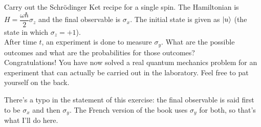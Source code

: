 \documentclass[solutions.tex]{subfiles}
\begin{document}
\maketitle
\begin{exercise} Carry out the Schr\"odinger Ket recipe for
a single spin. The Hamiltonian is $H = \dfrac{\omega\hbar}2\sigma_z$
and the final observable is $\sigma_x$. The initial state is given
as $|u\rangle$ (the state in which $\sigma_z = +1$). \\

After time $t$, an experiment is done to measure $\sigma_y$. What
are the possible outcomes and what are the probabilities for those
outcomes? \\

Congratulations! You have now solved a real quantum mechanics problem
for an experiment that can actually be carried out in the laboratory.
Feel free to pat yourself on the back.
\end{exercise}
\begin{remark} There's a typo in the statement of this exercise: the
final observable is said first to be $\sigma_x$ and then $\sigma_y$.
The French version of the book uses $\sigma_y$ for both, so that's what
I'll do here.
\end{remark}
\end{document}
